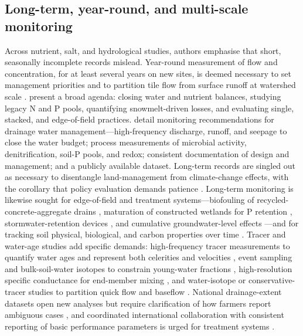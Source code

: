 \subsection{Long-term, year-round, and multi-scale monitoring}

Across nutrient, salt, and hydrological studies, authors emphasise that short,
seasonally incomplete records mislead. Year-round measurement of flow and
concentration, for at least several years on new sites, is deemed necessary to set
management priorities and to partition tile flow from surface runoff at watershed
scale \parencite{Kladivko2001}. \textcite{Sharpley2019} present a broad agenda:
closing water and nutrient balances, studying legacy N and P pools,
quantifying snowmelt-driven losses, and evaluating single, stacked, and
edge-of-field practices. \textcite{Frankenberger2024} detail monitoring
recommendations for drainage water management---high-frequency discharge, runoff,
and seepage to close the water budget; process measurements of microbial activity,
denitrification, soil-P pools, and redox; consistent documentation of design and
management; and a publicly available dataset. Long-term records are singled out as
necessary to disentangle land-management from climate-change effects, with the
corollary that policy evaluation demands patience
\parencite{Bauwe2020,Kelley2017,Gillingham2000,Lemke2011}. Long-term monitoring is
likewise sought for edge-of-field and treatment systems---biofouling of
recycled-concrete-aggregate drains \parencite{McCulloch2017}, maturation of
constructed wetlands for P retention \parencite{Mendes2020}, stormwater-retention
devices \parencite{Xu2022}, and cumulative groundwater-level effects
\parencite{Okuda2020}---and for tracking soil physical, biological, and carbon
properties over time \parencite{Frankl2023,Furukawa2008}. Tracer and water-age
studies add specific demands: high-frequency tracer measurements to quantify water
ages and represent both celerities and velocities \parencite{Williams2021},
event sampling and bulk-soil-water isotopes to constrain young-water fractions
\parencite{DimitrovaPetrova2020}, high-resolution specific conductance for
end-member mixing \parencite{Kronholm2015,Schilling2019}, and water-isotope or
conservative-tracer studies to partition quick flow and baseflow
\parencite{Frederiksen2023}. National drainage-extent datasets open new analyses
but require clarification of how farmers report ambiguous cases
\parencite{Jame2022}, and coordinated international collaboration with consistent
reporting of basic performance parameters is urged for treatment systems
\parencite{Messer2021,Sims1998}.

